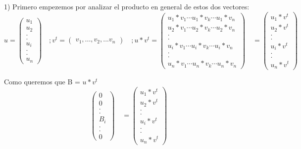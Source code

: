 \documentclass[a4paper]{article}
\begin{document}
1) Primero empezemos por analizar el producto en general de estos dos vectores: 
$$
u=
\begin{pmatrix} 
u_1\\
u_2\\
.\\
.\\
u_i\\
.\\
.\\
u_n
\end{pmatrix}
\quad
 ;v^t=
\begin{pmatrix} 
v_1,...,v_2,...v_n
\end{pmatrix}
\quad
;u*v^t=
\begin{pmatrix} 
u_1*v_1 \cdots u_1*v_k \cdots u_1*v_n\\
u_2*v_1 \cdots u_2*v_k  \cdots u_2*v_n\\
.\\
.\\
u_i*v_1 \cdots u_i*v_k \cdots u_i*v_n\\
.\\
.\\
u_n*v_1 \cdots u_n*v_k  \cdots u_n*v_n
\end{pmatrix}
\quad
=
\begin{pmatrix} 
u_1*v^t\\
u_2*v^t\\
.\\
.\\
u_i*v^t\\
.\\
.\\
u_n*v^t
\end{pmatrix}
$$

Como queremos que B = $u*v^t$
$$
\begin{pmatrix} 
0\\
0\\
.\\
.\\
B_i\\
.\\
.\\
0
\end{pmatrix}
\quad
=
\begin{pmatrix} 
u_1*v^t\\
u_2*v^t\\
.\\
.\\
u_i*v^t\\
.\\
.\\
u_n*v^t
\end{pmatrix}
$$
\end{document}
